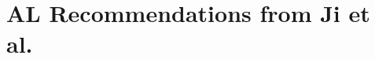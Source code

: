 \documentclass[]{article}
\newcommand{\R}{\mathbb{R}}
\newcommand{\EE}{\mathbb{E}}
\newcommand{\N}{\mathbb{N}}
\newcommand{\D}{\mathcal{D}}
\newcommand{\X}{\mathcal{X}}
\newcommand{\Y}{\mathcal{Y}}
\newcommand{\test}{\text{test}}
\newcommand{\train}{\text{train}}
\begin{document}



\section{AL Recommendations from Ji et al.}\label{app:recommendations}
\end{document}
